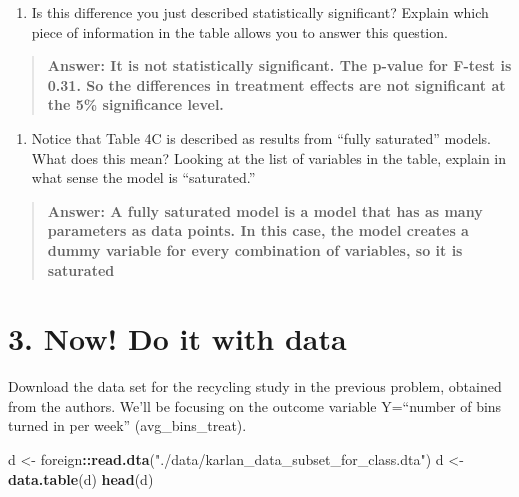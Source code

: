 \documentclass[
]{article}
\newenvironment{Shaded}{\begin{snugshade}}{\end{snugshade}}
\newcommand{\KeywordTok}[1]{\textcolor[rgb]{0.13,0.29,0.53}{\textbf{#1}}}
\newcommand{\NormalTok}[1]{#1}
\newcommand{\OperatorTok}[1]{\textcolor[rgb]{0.81,0.36,0.00}{\textbf{#1}}}
\newcommand{\StringTok}[1]{\textcolor[rgb]{0.31,0.60,0.02}{#1}}
\providecommand{\tightlist}{%
  \setlength{\itemsep}{0pt}\setlength{\parskip}{0pt}}
\begin{document}
\begin{enumerate}
\def\labelenumi{\arabic{enumi}.}
\setcounter{enumi}{4}
\tightlist
\item
  Is this difference you just described statistically significant?
  Explain which piece of information in the table allows you to answer
  this question.
\end{enumerate}

\begin{quote}
\textbf{Answer: It is not statistically significant. The p-value for
F-test is 0.31. So the differences in treatment effects are not
significant at the 5\% significance level.}
\end{quote}

\begin{enumerate}
\def\labelenumi{\arabic{enumi}.}
\setcounter{enumi}{5}
\tightlist
\item
  Notice that Table 4C is described as results from ``fully saturated''
  models. What does this mean? Looking at the list of variables in the
  table, explain in what sense the model is ``saturated.''
\end{enumerate}

\begin{quote}
\textbf{Answer: A fully saturated model is a model that has as many
parameters as data points. In this case, the model creates a dummy
variable for every combination of variables, so it is saturated}
\end{quote}

\hypertarget{now-do-it-with-data}{%
\section{3. Now! Do it with data}\label{now-do-it-with-data}}

Download the data set for the recycling study in the previous problem,
obtained from the authors. We'll be focusing on the outcome variable
Y=``number of bins turned in per week'' (avg\_bins\_treat).

\begin{Shaded}
\begin{Highlighting}[]
\NormalTok{d <-}\StringTok{ }\NormalTok{foreign}\OperatorTok{::}\KeywordTok{read.dta}\NormalTok{(}\StringTok{"./data/karlan_data_subset_for_class.dta"}\NormalTok{)}
\NormalTok{d <-}\StringTok{ }\KeywordTok{data.table}\NormalTok{(d)}
\KeywordTok{head}\NormalTok{(d)}
\end{Highlighting}
\end{Shaded}
\end{document}
